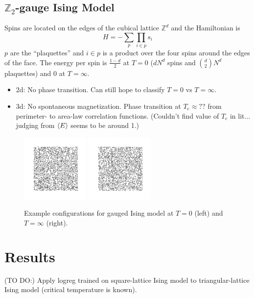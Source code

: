 \documentclass[11pt]{article}
\begin{document}
\subsection{$\mathbb{Z}_2$-gauge Ising Model}
Spins are located on the edges of the cubical lattice $\mathbb{Z}^d$ and the Hamiltonian is
\begin{equation}
    H = -\sum_p\prod_{i\in p}s_i
\end{equation}
$p$ are the ``plaquettes'' and $i\in p$ is a product over the four spins around the edges of the face. The energy per spin is $\frac{1-d}{2}$ at $T=0$ ($dN^d$ spins and $\binom{d}{2}N^d$ plaquettes) and 0 at $T=\infty$.
\begin{itemize}
    \item 2d: No phase transition. Can still hope to classify $T=0$ vs $T=\infty$.
    \item 3d: No spontaneous magnetization. Phase transition at $T_\text{c}\approx??$ from perimeter- to area-law correlation functions. (Couldn't find value of $T_\text{c}$ in lit... judging from $\ev{E}$ seems to be around 1.)
\end{itemize}
\begin{figure}[h]
    \centering
    \includegraphics[width=0.3\textwidth]{gauged_images/gauged_T=0.png}
    \includegraphics[width=0.3\textwidth]{gauged_images/gauged_T=inf.png}
    \caption{Example configurations for gauged Ising model at $T=0$ (left) and $T=\infty$ (right).}
\end{figure}


\section{Results}
(TO DO:) Apply logreg trained on square-lattice Ising model to triangular-lattice Ising model (critical temperature is known).
\end{document}
